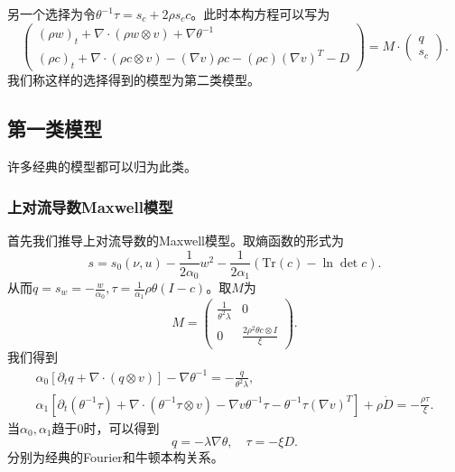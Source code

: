 \documentclass{article}
\begin{document}
	另一个选择为令$\theta^{-1} \tau = s_c + 2 \rho s_c c$。此时本构方程可以写为
	\begin{equation}
	\left( \begin{array}{c} 
			(\rho w)_t +  \nabla \cdot (\rho w \otimes v)  + \nabla \theta^{-1} \\
			(\rho c)_t +  \nabla \cdot (\rho c \otimes v) - (\nabla v) \rho c - (\rho c) (\nabla v)^T - D 
		\end{array} \right) = M \cdot
		\left( \begin{array}{c} 
			q \\ s_c
		\end{array}\right).	
	\end{equation}
	我们称这样的选择得到的模型为第二类模型。

	\subsection{第一类模型}
	许多经典的模型都可以归为此类。
	\subsubsection{上对流导数Maxwell模型}
	首先我们推导上对流导数的Maxwell模型。取熵函数的形式为
	\begin{equation*}
			s = s_0(\nu,u)  - \frac{1}{2  \alpha_0} w^2 - \frac{1}{2  \alpha_1} (\mbox{Tr}(c) - \ln \det c).
	\end{equation*}
	从而$q=s_w=-\frac{ w}{\alpha_0},\tau = \frac{1}{\alpha_1} \rho \theta (I-c)$。取$M$为
	\begin{equation*}
		M = \left( \begin{array}{ccc} 
			\frac{1}{\theta^2 \lambda} & 0 \\
			0 &  \frac{2 \rho^2 \theta c \otimes I}{\xi}   
		\end{array} \right).
	\end{equation*}
	我们得到
	\begin{eqnarray*}
		\alpha_0 [\partial_t q +  \nabla \cdot (q \otimes v)] - \nabla \theta^{-1} = -\frac{q}{\theta^2 \lambda}, \\
		\alpha_1[\partial_t (\theta^{-1} {\tau}) + \nabla \cdot (\theta^{-1} {\tau} \otimes v) - \nabla v \theta^{-1} \tau - \theta^{-1}\tau (\nabla v)^T] + \rho \dot{D} = -\frac{{\rho \tau}}{\xi}.
	\end{eqnarray*}
	当$\alpha_0, \alpha_1$趋于0时，可以得到
	\begin{equation*}
		q = -\lambda \nabla \theta, \quad \tau = - \xi {D} .
	\end{equation*}
	分别为经典的Fourier和牛顿本构关系。
\end{document}
